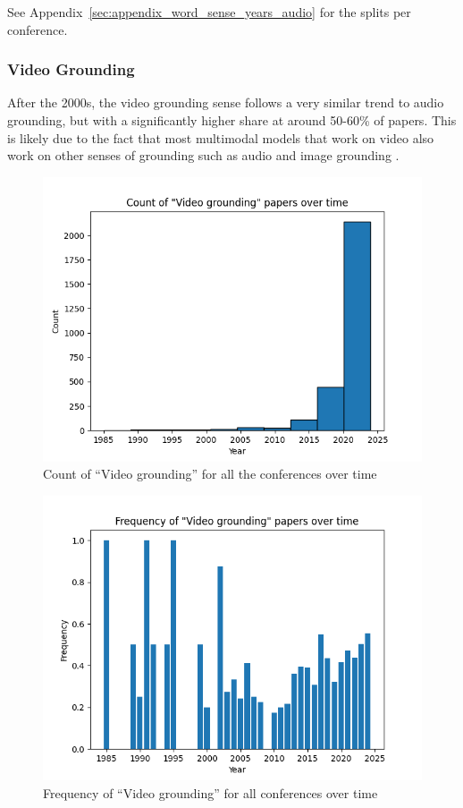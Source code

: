 \documentclass[11pt]{article}
\begin{document}
See Appendix~\ref{sec:appendix_word_sense_years_audio} for the splits per conference.

\subsubsection{Video Grounding}
After the 2000s, the video grounding sense follows a very similar trend to audio grounding, but with a significantly higher share at around 50-60\% of papers. This is likely due to the fact that most multimodal models that work on video also work on other senses of grounding such as audio and image grounding \cite{li-etal-2024-groundinggpt}.
\begin{figure}[h!]
  \includegraphics[width=\columnwidth]{figs/grounding_figs/Video/all_confs_grounding_Video.png}
  \caption{Count of ``Video grounding'' for all the conferences over time}
  \label{fig:video_all_confs_count}
\end{figure}

\begin{figure}[h!]
  \includegraphics[width=\columnwidth]{figs/freq_grounding_figs/Video/all_confs_grounding_Video.png}
  \caption{Frequency of ``Video grounding'' for all conferences over time}
  \label{fig:video_all_confs_freq}
\end{figure}
\end{document}

